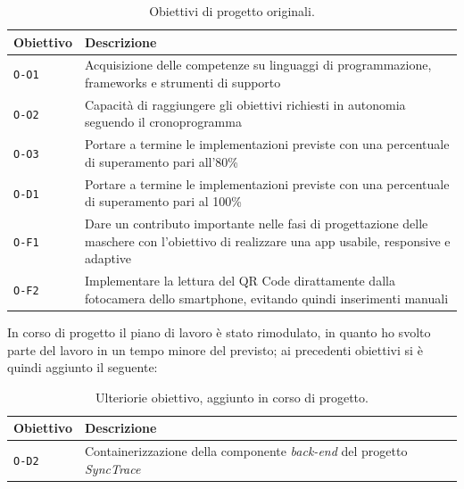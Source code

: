 \begin{table}[h]
\begin{tabularx}{\textwidth}{|l|X|}
\hline
\textbf{Obiettivo}           & \textbf{Descrizione}                                                                                                                          \\ \hline
\texttt{O-O1} & Acquisizione delle competenze su linguaggi di programmazione, frameworks e strumenti di supporto                                              \\ \hline
\texttt{O-O2} & Capacità di raggiungere gli obiettivi richiesti in autonomia seguendo il cronoprogramma                                                       \\ \hline
\texttt{O-O3} & Portare a termine le implementazioni previste con una percentuale di superamento pari all'80\%                                                \\ \hline
\texttt{O-D1} & Portare a termine le implementazioni previste con una percentuale di superamento pari al 100\%                                                \\ \hline
\texttt{O-F1} & Dare un contributo importante nelle fasi di progettazione delle maschere con l'obiettivo di realizzare una app usabile, responsive e adaptive \\ \hline
\texttt{O-F2} & Implementare la lettura del QR Code dirattamente dalla fotocamera dello smartphone, evitando quindi inserimenti manuali                       \\ \hline
\end{tabularx}
\caption{Obiettivi di progetto originali.}
\end{table}

In corso di progetto il piano di lavoro è stato rimodulato, in quanto ho svolto parte del lavoro in un tempo minore del previsto; ai precedenti obiettivi si è quindi aggiunto il seguente:

\begin{table}[h]
\begin{tabularx}{\textwidth}{|l|X|}
\hline
\textbf{Obiettivo}           & \textbf{Descrizione}                                                                                                                          \\ \hline
\texttt{O-D2} & Containerizzazione della componente \textit{back-end} del progetto \textit{SyncTrace}                                              \\ \hline
\end{tabularx}
\caption{Ulteriorie obiettivo, aggiunto in corso di progetto.}
\end{table}

